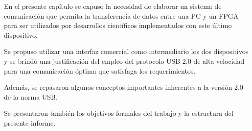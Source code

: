 En el presente capítulo se expuso la necesidad de elaborar un sistema de comunicación que permita la transferencia de datos entre una PC y un FPGA para ser utilizados por desarrollos científicos implementados con este último dispositivo.

Se propuso utilizar una interfaz comercial como intermediario los dos dispositivos y se brindó una justificación del empleo del protocolo USB 2.0 de alta velocidad para una comunicación óptima que satisfaga los requerimientos.

Además, se repasaron algunos conceptos importantes inherentes a la versión 2.0 de la norma USB.

Se presentaron también los objetivos formales del trabajo y la estructura del presente informe.
